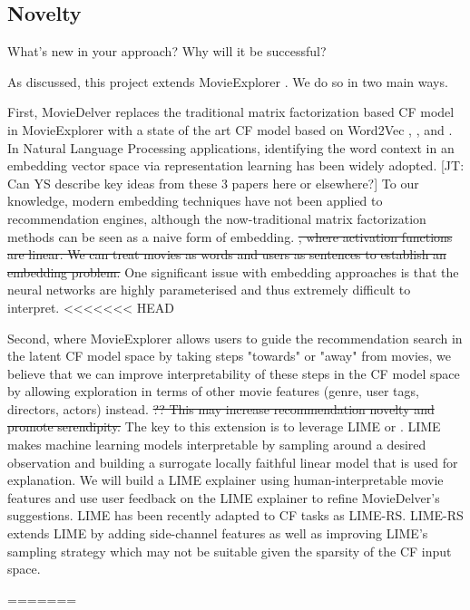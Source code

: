 \subsection{Novelty}
What's new in your approach? Why will it be successful?

As discussed, this project extends MovieExplorer \cite{taijala2018movieexplorer}. We do so in two main ways. 

First, MovieDelver replaces the traditional matrix factorization based CF model in MovieExplorer with a state of the art  CF model based on Word2Vec \cite{mikolov2013efficient}, \cite{rong2014word2vec}, and \cite{rong2014word2vec}. In Natural Language Processing applications, identifying the word context in an embedding vector space via representation learning has been widely adopted. [JT: Can YS describe key ideas from these 3 papers here or elsewhere?] To our knowledge, modern embedding techniques have not been applied to recommendation engines, although the now-traditional matrix factorization methods can be seen as a naive form of embedding. \st{, where activation functions are linear. We can treat movies as words and users as sentences to establish an embedding problem.} One significant issue with embedding approaches is that the neural networks are highly parameterised and thus extremely difficult to interpret.
<<<<<<< HEAD

Second, where MovieExplorer allows users to guide the recommendation search in the latent CF model space by taking steps "towards" or "away" from movies, we believe that we can improve interpretability of these steps in the CF model space by allowing exploration in terms of other movie features (genre, user tags, directors, actors) instead. \st{?? This may increase recommendation novelty and promote serendipity.} The key to this extension is to leverage LIME  \cite{ribeiro2016model} or  \cite{ribeiro2016should}. LIME makes machine learning models interpretable by sampling around a desired observation and building a surrogate locally faithful linear model that is used for explanation. We will build a LIME explainer using human-interpretable movie features and use user feedback on the LIME explainer to refine MovieDelver's suggestions. LIME has been recently adapted to CF tasks \cite{nobrega2019towards} as LIME-RS. LIME-RS extends LIME by adding side-channel features as well as improving LIME's sampling strategy which may not be suitable given the sparsity of the CF input space.

=======
 
